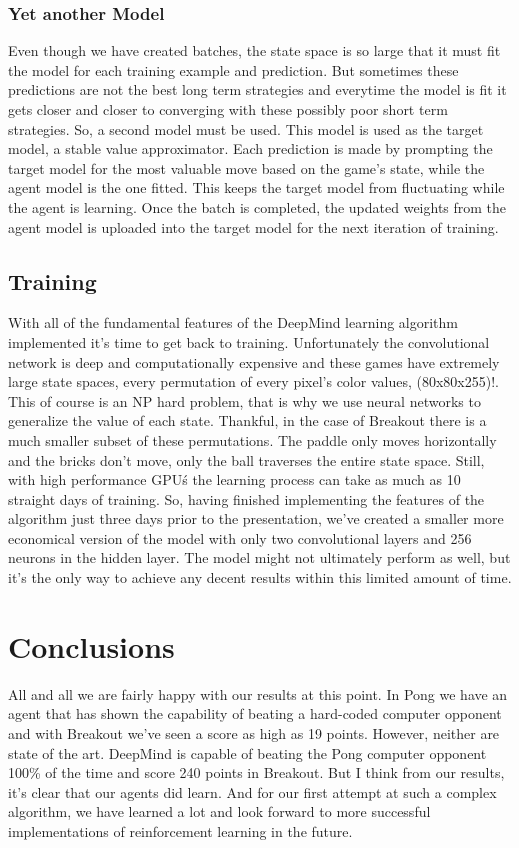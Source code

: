 \documentclass[%
 aip,
 jmp,%
 amsmath,amssymb,
 reprint,%
]{revtex4-1}
\begin{document}
\subsubsection{Yet another Model}
Even though we have created batches, the state space is so large that it must fit the model for each training example and prediction. But sometimes these predictions are not the best long term strategies and everytime the model is fit it gets closer and closer to converging with these possibly poor short term strategies. So, a second model must be used. This model is used as the target model, a stable value approximator. Each prediction is made by prompting the target model for the most valuable move based on the game's state, while the agent model is the one fitted. This keeps the target model from fluctuating while the agent is learning. Once the batch is completed, the updated weights from the agent model is uploaded into the target model for the next iteration of training. 

\subsection{Training}
With all of the fundamental features of the DeepMind learning algorithm implemented it's time to get back to training. Unfortunately the convolutional network is deep and computationally expensive and these games have extremely large state spaces, every permutation of every pixel’s color values, (80x80x255)!. This of course is an NP hard problem, that is why we use neural networks to generalize the value of each state. Thankful, in the case of Breakout there is a much smaller subset of these permutations. The paddle only moves horizontally and the bricks don't move, only the ball traverses the entire state space. Still, with high performance GPU\'s the learning process can take as much as 10 straight days of training. So, having finished implementing the features of the algorithm just three days prior to the presentation, we've created a smaller more economical version of the model with only two convolutional layers and 256 neurons in the hidden layer. The model might not ultimately perform as well, but it's the only way to achieve any decent results within this limited amount of time. 

\section{Conclusions}
All and all we are fairly happy with our results at this point. In Pong we have an agent that has shown the capability of beating a hard-coded computer opponent and with Breakout we've seen a score as high as 19 points. However, neither are state of the art. DeepMind is capable of beating the Pong computer opponent 100\% of the time and score 240 points in Breakout. But I think from our results, it's clear that our agents did learn. And for our first attempt at such a complex algorithm, we have learned a lot and look forward to more successful implementations of reinforcement learning in the future.
\end{document}
